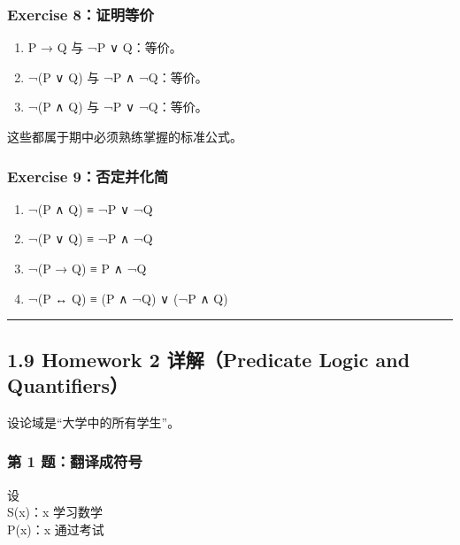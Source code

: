 \documentclass[
  11pt,
]{article}
\providecommand{\tightlist}{%
  \setlength{\itemsep}{0pt}\setlength{\parskip}{0pt}}
\begin{document}
\subsubsection{Exercise
8：证明等价}\label{exercise-8ux8bc1ux660eux7b49ux4ef7}

\begin{enumerate}
\def\labelenumi{\arabic{enumi}.}
\tightlist
\item
  P → Q 与 ¬P ∨ Q：等价。\\
\item
  ¬(P ∨ Q) 与 ¬P ∧ ¬Q：等价。\\
\item
  ¬(P ∧ Q) 与 ¬P ∨ ¬Q：等价。
\end{enumerate}

这些都属于期中必须熟练掌握的标准公式。

\subsubsection{Exercise
9：否定并化简}\label{exercise-9ux5426ux5b9aux5e76ux5316ux7b80}

\begin{enumerate}
\def\labelenumi{\arabic{enumi}.}
\tightlist
\item
  ¬(P ∧ Q) ≡ ¬P ∨ ¬Q
\item
  ¬(P ∨ Q) ≡ ¬P ∧ ¬Q
\item
  ¬(P → Q) ≡ P ∧ ¬Q
\item
  ¬(P ↔ Q) ≡ (P ∧ ¬Q) ∨ (¬P ∧ Q)
\end{enumerate}

\begin{center}\rule{0.5\linewidth}{0.5pt}\end{center}

\subsection{1.9 Homework 2 详解（Predicate Logic and
Quantifiers）}\label{homework-2-ux8be6ux89e3predicate-logic-and-quantifiers}

设论域是``大学中的所有学生''。

\subsubsection{第 1
题：翻译成符号}\label{ux7b2c-1-ux9898ux7ffbux8bd1ux6210ux7b26ux53f7}

设\\
S(x)：x 学习数学\\
P(x)：x 通过考试
\end{document}
